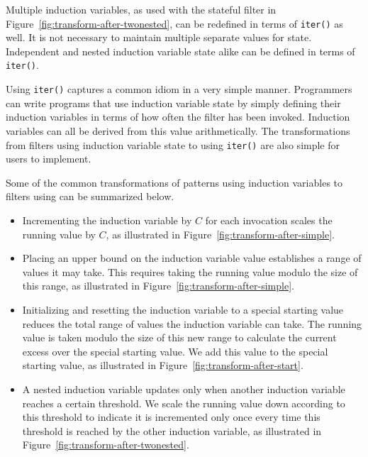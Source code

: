Multiple induction variables, as used with the stateful filter in Figure~\ref{fig:transform-after-twonested}, can be redefined in terms of {\tt iter()} as well.  It is not necessary to maintain multiple separate values for state.  Independent and nested induction variable state alike can be defined in terms of {\tt iter()}.

Using {\tt iter()} captures a common idiom in a very simple manner.  Programmers can write programs that use induction variable state by simply defining their induction variables in terms of how often the filter has been invoked.  Induction variables can all be derived from this value arithmetically.  The transformations from filters using induction variable state to using {\tt iter()} are also simple for users to implement.  

Some of the common transformations of patterns using induction variables to filters using \iter can be summarized below.  
\begin{itemize}
\item Incrementing the induction variable by $C$ for each invocation scales the running value by $C$, as illustrated in Figure~\ref{fig:transform-after-simple}.

\item Placing an upper bound on the induction variable value establishes a range of values it may take.  This requires taking the running value modulo the size of this range, as illustrated in Figure~\ref{fig:transform-after-simple}.

\item Initializing and resetting the induction variable to a special starting value reduces the total range of values the induction variable can take.  The running value is taken modulo the size of this new range to calculate the current excess over the special starting value.  We add this value to the special starting value, as illustrated in Figure~\ref{fig:transform-after-start}.

\item A nested induction variable updates only when another induction variable reaches a certain threshold.  We scale the running value down according to this threshold to indicate it is incremented only once every time this threshold is reached by the other induction variable, as illustrated in Figure~\ref{fig:transform-after-twonested}.
\end{itemize}
